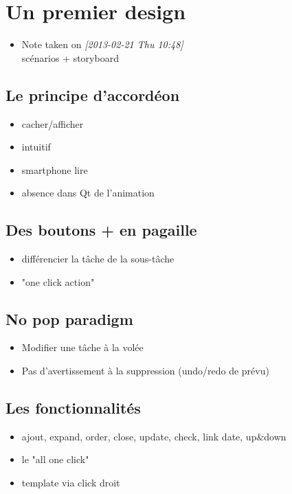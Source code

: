 \documentclass[11pt]{article}
\begin{document}
\section[Un premier design]{Un premier design}
\label{sec-2}
\begin{itemize}
\item Note taken on \textit{[2013-02-21 Thu 10:48]} \\
    scénarios + storyboard
\end{itemize}

\subsection[Le principe d'accordéon]{Le principe d'accordéon}
\label{sec-2-1}
\begin{itemize}
\item cacher/afficher
\item intuitif
\item smartphone lire
\item absence dans Qt de l'animation
\end{itemize}
\subsection[Des boutons + en pagaille]{Des boutons + en pagaille}
\label{sec-2-2}
\begin{itemize}
\item différencier la tâche de la sous-tâche
\item "one click action"
\end{itemize}
\subsection[No pop paradigm]{No pop paradigm}
\label{sec-2-3}
\begin{itemize}
\item Modifier une tâche à la volée
\item Pas d'avertissement à la suppression (undo/redo de prévu)
\end{itemize}
\subsection[Les fonctionnalités]{Les fonctionnalités}
\label{sec-2-4}
\begin{itemize}
\item ajout, expand, order, close, update, check, link date, up\&down
\item le "all one click"
\item template via click droit
\end{itemize}
\end{document}

